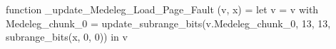 function _update_Medeleg_Load_Page_Fault (v, x) = let v = { v with Medeleg_chunk_0 = update_subrange_bits(v.Medeleg_chunk_0, 13, 13, subrange_bits(x, 0, 0)) } in
  v
